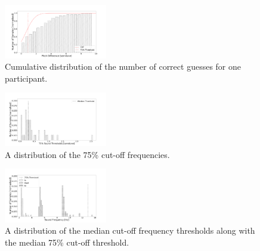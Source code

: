 \documentclass[sigconf, review=true, screen=true, anonymous=true]{acmart}
\begin{document}
\begin{figure}
  \centering
  \includegraphics[clip, trim=120 0 120 70, width=0.4\textwidth]{figures/cdf_tone_guesses.png}
  \caption{Cumulative distribution of the number of correct guesses for one participant. }
  \label{fig:cdf-semitone}
\end{figure}

\begin{figure}
  \centering
  \includegraphics[clip, trim=80 20 120 0, width=0.4\textwidth]{figures/tone_threshold.png}
  \caption{A distribution of the 75\% cut-off frequencies. }
  \label{fig:tone-threshold}
\end{figure}
\begin{figure}
  \centering
  \includegraphics[clip, trim=80 20 120 0, width=0.4\textwidth]{figures/tone_medians.png}
  \caption{A distribution of the median cut-off frequency thresholds along with the median 75\% cut-off threshold. }
  \label{fig:tone-medians}
\end{figure}
\end{document}
